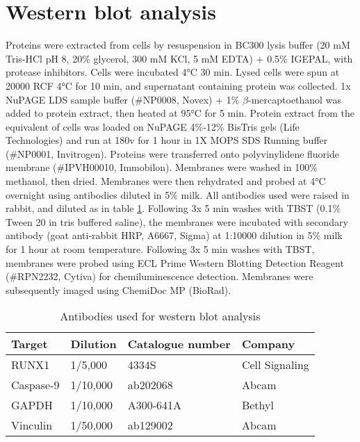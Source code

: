 \section{Western blot analysis}

Proteins were extracted from  cells by resuspension in BC300 lysis buffer (20 mM Tris-HCl pH 8, 20\% glycerol, 300 mM KCl, 5 mM EDTA) + 0.5\% IGEPAL, with protease inhibitors. Cells were incubated 4°C 30 min. Lysed cells were spun at 20000 RCF 4°C for 10 min, and supernatant containing protein was collected. 1x NuPAGE LDS sample buffer (\#NP0008, Novex) + 1\% $\beta$-mercaptoethanol was added to protein extract, then heated at 95°C for 5 min. Protein extract from the equivalent of  cells was loaded on NuPAGE 4\%-12\% BisTris gels (Life Technologies) and run at 180v for 1 hour in 1X MOPS SDS Running buffer (\#NP0001, Invitrogen). Proteins were transferred onto polyvinylidene fluoride membrane (\#IPVH00010, Immobilon). Membranes were washed in 100\% methanol, then dried. Membranes were then rehydrated and probed at 4°C overnight using antibodies diluted in 5\% milk. All antibodies used were raised in rabbit, and diluted as in table \ref{tbl:ch2_western}. Following 3x 5 min washes with TBST (0.1\% Tween 20 in tris buffered saline), the membranes were incubated with secondary antibody (goat anti-rabbit HRP, A6667, Sigma) at 1:10000 dilution in 5\% milk for 1 hour at room temperature. Following 3x 5 min washes with TBST, membranes were probed using ECL Prime Western Blotting Detection Reagent (\#RPN2232, Cytiva) for chemiluminescence detection. Membranes were subsequently imaged using ChemiDoc MP (BioRad).

    \begin{table}[ht]
    \centering
    \caption{Antibodies used for western blot analysis}
    \begin{tabular}{@{}llll@{}}
    \toprule
    \textbf{Target} & \textbf{Dilution} & \textbf{Catalogue number} & \textbf{Company} \\ \midrule
    RUNX1 & 1/5,000 & 4334S & Cell Signaling \\
    Caspase-9 & 1/10,000 & ab202068 & Abcam \\
    GAPDH & 1/10,000 & A300-641A & Bethyl \\
    Vinculin & 1/50,000 & ab129002 & Abcam \\ \bottomrule
    \end{tabular}
    \label{tbl:ch2_western}
    \end{table}

